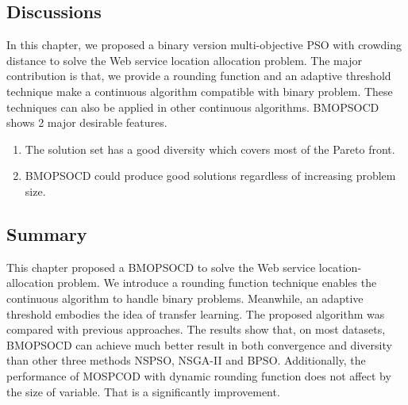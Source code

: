 \subsection{Discussions}
In this chapter, we proposed a binary version multi-objective PSO with crowding distance to solve the Web service location allocation problem.
The major contribution is that, we provide a rounding function and an adaptive threshold technique make a continuous algorithm compatible with binary problem.
These techniques can also be applied in other continuous algorithms.
BMOPSOCD shows 2 major desirable features. 
\begin{enumerate}
	\item The solution set has a good diversity which covers most of the Pareto front.
	\item BMOPSOCD could produce good solutions regardless of increasing problem size.
\end{enumerate}

\subsection{Summary}
This chapter proposed a BMOPSOCD to solve the Web service location-allocation problem. We introduce a rounding function technique 
enables the continuous algorithm to handle binary problems. Meanwhile, an adaptive threshold embodies the idea of transfer
learning.
The proposed algorithm was compared with previous approaches. The results show that, on most datasets, BMOPSOCD can achieve much better result in both convergence and diversity than other three
methods NSPSO, NSGA-II and BPSO. Additionally, the performance of MOSPCOD with dynamic rounding function does not affect by the size of variable. That is
a significantly improvement.


